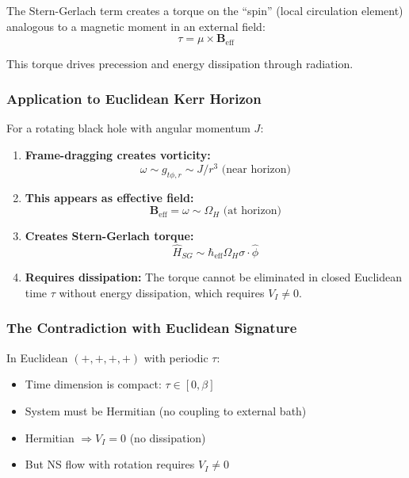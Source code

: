 \documentclass[11pt]{article}
\begin{document}
The Stern-Gerlach term creates a torque on the ``spin'' (local circulation element) analogous to a magnetic moment in an external field:
\begin{equation}
\tau = \mu \times \mathbf{B}_{\text{eff}}
\end{equation}

This torque drives precession and energy dissipation through radiation.

\subsubsection{Application to Euclidean Kerr Horizon}

For a rotating black hole with angular momentum $J$:

\begin{enumerate}
\item \textbf{Frame-dragging creates vorticity:}
\begin{equation}
\omega \sim g_{t\phi,r} \sim J/r^3 \text{ (near horizon)}
\end{equation}

\item \textbf{This appears as effective field:}
\begin{equation}
\mathbf{B}_{\text{eff}} = \omega \sim \Omega_H \text{ (at horizon)}
\end{equation}

\item \textbf{Creates Stern-Gerlach torque:}
\begin{equation}
\hat{H}_{SG} \sim \hbar_{\text{eff}} \Omega_H \sigma \cdot \hat{\phi}
\end{equation}

\item \textbf{Requires dissipation:}
The torque cannot be eliminated in closed Euclidean time $\tau$ without energy dissipation, which requires $V_I \neq 0$.
\end{enumerate}

\subsubsection{The Contradiction with Euclidean Signature}

In Euclidean $(+,+,+,+)$ with periodic $\tau$:
\begin{itemize}
\item Time dimension is compact: $\tau \in [0, \beta]$
\item System must be Hermitian (no coupling to external bath)
\item Hermitian $\Rightarrow V_I = 0$ (no dissipation)
\item But NS flow with rotation requires $V_I \neq 0$
\end{itemize}
\end{document}
